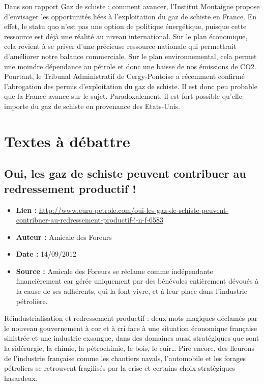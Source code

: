 \documentclass[8pt]{article}
\begin{document}
Dans son rapport Gaz de schiste : comment avancer, l’Institut Montaigne propose d’envisager les opportunités liées à l’exploitation du gaz de schiste en France. En effet, le statu quo n’est pas une option de politique énergétique, puisque cette ressource est déjà une réalité au niveau international. Sur le plan économique, cela revient à se priver d’une précieuse ressource nationale qui permettrait d’améliorer notre balance commerciale. Sur le plan environnemental, cela permet une moindre dépendance au pétrole et donc une baisse de nos émissions de CO2. Pourtant, le Tribunal Administratif de Cergy-Pontoise a récemment confirmé l’abrogation des permis d’exploitation du gaz de schiste. Il est donc peu probable que la France avance sur le sujet. Paradoxalement, il est fort possible qu’elle importe du gaz de schiste en provenance des Etats-Unis.

\newpage
\section{Textes à débattre}
\subsection{Oui, les gaz de schiste peuvent contribuer au redressement productif !}
\begin{itemize}
	\item \textbf{Lien : }  \url{http://www.euro-petrole.com/oui-les-gaz-de-schiste-peuvent-contribuer-au-redressement-productif-!-n-f-6583} 
	\item \textbf{Auteur : } Amicale des Foreurs
	\item \textbf{Date : } 14/09/2012
	\item \textbf{Source : } Amicale des Foreurs se réclame comme indépendante financièrement car gérée uniquement par des bénévoles entièrement dévoués à la cause de ses adhérents, qui la font vivre, et à leur place dans l’industrie pétrolière.
\end{itemize}


Réindustrialisation et redressement productif : deux mots magiques déclamés par le nouveau gouvernement à cor et à cri face à une situation économique française sinistrée et une industrie exsangue, dans des domaines aussi stratégiques que sont la sidérurgie, la chimie, la pétrochimie, le bois, le cuir… Pire encore, des fleurons de l’industrie française comme les chantiers navals, l’automobile et les forages pétroliers se retrouvent fragilisés par la crise et certains choix stratégiques hasardeux.\\
\end{document}
